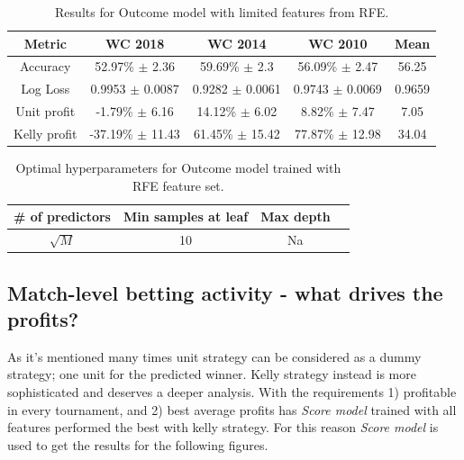 \begin{table}
    \caption{Results for Outcome model with limited features from RFE.}
    \begin{tabular}{| c | c| c| c|c|}
        \hline
        Metric& \textbf{WC 2018} & \textbf{WC 2014} & \textbf{WC 2010} & Mean\\
        \hline
        Accuracy  & 52.97\% $\pm$ 2.36 & 59.69\% $\pm$ 2.3 & 56.09\% $\pm$ 2.47& 56.25 \\
        Log Loss & 0.9953 $\pm$ 0.0087 & 0.9282 $\pm$ 0.0061 & 0.9743 $\pm$ 0.0069& 0.9659 \\
        Unit profit  & -1.79\% $\pm$ 6.16 & 14.12\% $\pm$ 6.02 & 8.82\% $\pm$ 7.47& 7.05 \\
        Kelly profit  & -37.19\% $\pm$ 11.43 & 61.45\% $\pm$ 15.42 & 77.87\% $\pm$ 12.98& 34.04 \\
 \hline
    \end{tabular}
    \label{table:outcomemodel_rfe}
\end{table}

\begin{table}
    \caption{Optimal hyperparameters for Outcome model trained with RFE feature set.}
    \begin{tabular}{| c | c| c| c|}
        \hline
         \# of predictors & Min samples at leaf & Max depth\\
        \hline
         $\sqrt{M}$ & 10 & Na \\
        \hline
    \end{tabular}
    \label{table:hyperparam_results_rfe}
\end{table}


\subsection{Match-level betting activity - what drives the profits?}
As it's mentioned many times unit strategy can be considered as a dummy strategy; one unit for the predicted winner. Kelly strategy instead is more sophisticated and deserves a deeper analysis. With the requirements 1) profitable in every tournament, and 2) best average profits has \textit{Score model} trained with all features performed the best with kelly strategy. For this reason \textit{Score model} is used to get the results for the following figures.

